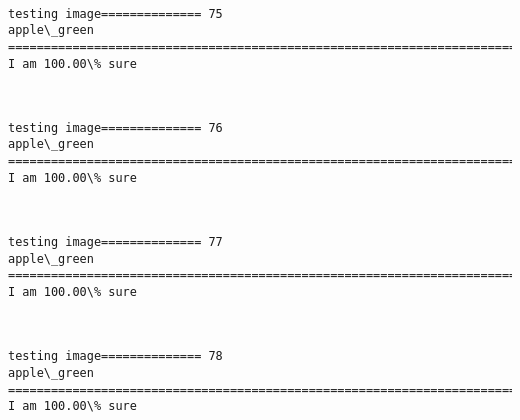 \documentclass[11pt]{article}
\begin{document}
    \begin{center}
    \end{center}
    { \hspace*{\fill} \\}
    
    \begin{Verbatim}[commandchars=\\\{\}]
testing image============== 75
apple\_green
============================================================================
I am 100.00\% sure

    \end{Verbatim}

    \begin{center}
    \end{center}
    { \hspace*{\fill} \\}
    
    \begin{Verbatim}[commandchars=\\\{\}]
testing image============== 76
apple\_green
============================================================================
I am 100.00\% sure

    \end{Verbatim}

    \begin{center}
    \end{center}
    { \hspace*{\fill} \\}
    
    \begin{Verbatim}[commandchars=\\\{\}]
testing image============== 77
apple\_green
============================================================================
I am 100.00\% sure

    \end{Verbatim}

    \begin{center}
    \end{center}
    { \hspace*{\fill} \\}
    
    \begin{Verbatim}[commandchars=\\\{\}]
testing image============== 78
apple\_green
============================================================================
I am 100.00\% sure

    \end{Verbatim}
\end{document}
